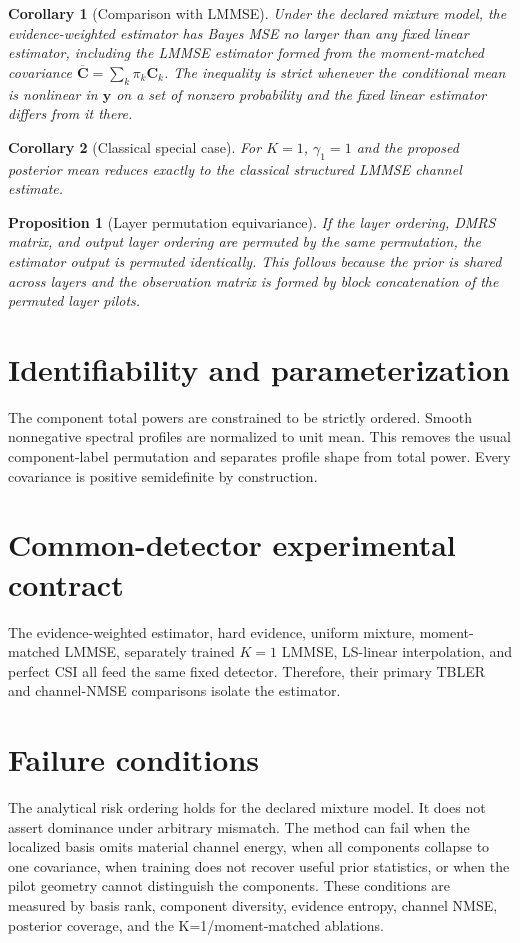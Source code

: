 \documentclass[10pt]{article}
\newtheorem{proposition}{Proposition}
\newtheorem{corollary}{Corollary}
\begin{document}
\begin{corollary}[Comparison with LMMSE]
Under the declared mixture model, the evidence-weighted estimator has Bayes MSE
no larger than any fixed linear estimator, including the LMMSE estimator formed
from the moment-matched covariance
$\overline{\bm C}=\sum_k\pi_k\bm C_k$.  The inequality is strict whenever the
conditional mean is nonlinear in $\bm y$ on a set of nonzero probability and
the fixed linear estimator differs from it there.
\end{corollary}

\begin{corollary}[Classical special case]
For $K=1$, $\gamma_1=1$ and the proposed posterior mean reduces exactly to the
classical structured LMMSE channel estimate.
\end{corollary}

\begin{proposition}[Layer permutation equivariance]
If the layer ordering, DMRS matrix, and output layer ordering are permuted by
the same permutation, the estimator output is permuted identically.  This
follows because the prior is shared across layers and the observation matrix is
formed by block concatenation of the permuted layer pilots.
\end{proposition}

\section{Identifiability and parameterization}
The component total powers are constrained to be strictly ordered.  Smooth
nonnegative spectral profiles are normalized to unit mean.  This removes the
usual component-label permutation and separates profile shape from total
power.  Every covariance is positive semidefinite by construction.

\section{Common-detector experimental contract}
The evidence-weighted estimator, hard evidence, uniform mixture,
moment-matched LMMSE, separately trained $K=1$ LMMSE, LS-linear interpolation,
and perfect CSI all feed the same fixed detector.  Therefore, their primary
TBLER and channel-NMSE comparisons isolate the estimator.

\section{Failure conditions}
The analytical risk ordering holds for the declared mixture model.  It does not
assert dominance under arbitrary mismatch.  The method can fail when the
localized basis omits material channel energy, when all components collapse to
one covariance, when training does not recover useful prior statistics, or when
the pilot geometry cannot distinguish the components.  These conditions are
measured by basis rank, component diversity, evidence entropy, channel NMSE,
posterior coverage, and the K=1/moment-matched ablations.
\end{document}
